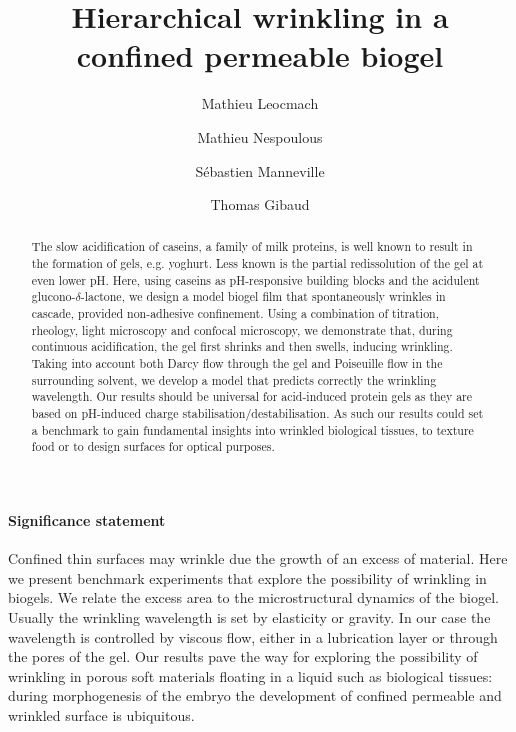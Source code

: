 \documentclass[twocolumn,superscriptaddress,showpacs,preprintnumbers,
amsmath,amssymb,prl]{revtex4-1}
\begin{document}
\title{Hierarchical wrinkling in a confined permeable biogel}
\author{Mathieu Leocmach}
\author{Mathieu Nespoulous}
\author{Sébastien Manneville}
\author{Thomas Gibaud}

\begin{abstract}
The slow acidification of caseins, a family of milk proteins, is well known to result in the formation of gels, e.g. yoghurt. Less known is the partial redissolution of the gel at even lower pH. Here, using caseins as pH-responsive building blocks and the acidulent glucono-$\delta$-lactone, we design a model biogel film that spontaneously wrinkles in cascade, provided non-adhesive confinement. Using a combination of titration, rheology, light microscopy and confocal microscopy, we demonstrate that, during continuous acidification, the gel first shrinks and then swells, inducing wrinkling. Taking into account both Darcy flow through the gel and Poiseuille flow in the surrounding solvent, we develop a model that predicts correctly the wrinkling wavelength. Our results should be universal for acid-induced protein gels as they are based on pH-induced charge stabilisation/destabilisation. As such our results could set a benchmark to gain fundamental insights into wrinkled biological tissues, to texture food or to design surfaces for optical purposes.
\end{abstract}

\maketitle

\paragraph*{Significance statement}
Confined thin surfaces may wrinkle due the growth of an excess of material. Here we present benchmark experiments that explore the possibility of wrinkling in biogels. We relate the excess area to the microstructural dynamics of the biogel. Usually the wrinkling wavelength is set by elasticity or gravity. In our case the wavelength is controlled by viscous flow, either in a lubrication layer or through the pores of the gel. Our results pave the way for exploring the possibility of wrinkling in porous soft materials floating in a liquid such as biological tissues: during morphogenesis of the embryo the development of confined permeable and wrinkled surface is ubiquitous.
\end{document}
